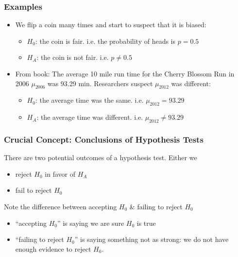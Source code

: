 \documentclass[handout]{beamer}
\newcommand{\blue}[1]{\textcolor{blue2}{#1}}
\begin{document}
\begin{frame}
\frametitle{Examples}
\begin{itemize}
\item We flip a coin many times and start to suspect that it is biased:
\begin{itemize}
\pause \item $H_0$: the coin is fair.  i.e. the probability of heads is $p=0.5$
\item $H_A$: the coin is not fair.  i.e. $p \neq 0.5$
\end{itemize}
\pause \item From book:  The average 10 mile run time for the Cherry Blossom Run in 2006 $\mu_{2006}$ was 93.29 min.  Researchers suspect $\mu_{2012}$ was different:
\begin{itemize}
\pause \item $H_0$: the average time was the same. i.e. $\mu_{2012} = 93.29$
\item $H_A$: the average time was different. i.e. $\mu_{2012} \neq 93.29$
\end{itemize}
\end{itemize}
\end{frame}



\begin{frame}
\frametitle{Crucial Concept: Conclusions of Hypothesis Tests}
There are two potential outcomes of a hypothesis test.  Either we
\pause \begin{itemize}
\item reject $H_0$ in favor of $H_A$
\item fail to reject $H_0$
\end{itemize}

\vspace{0.5cm}

\pause Note the difference between \blue{accepting $H_0$} \& \blue{failing to reject $H_0$}
\begin{itemize}
\pause \item ``accepting $H_0$'' is saying we are sure $H_0$ is true
\pause \item ``failing to reject $H_0$'' is saying something not as strong:  \blue{we do not have enough evidence to reject $H_0$}.
\end{itemize}

\end{frame}
\end{document}
